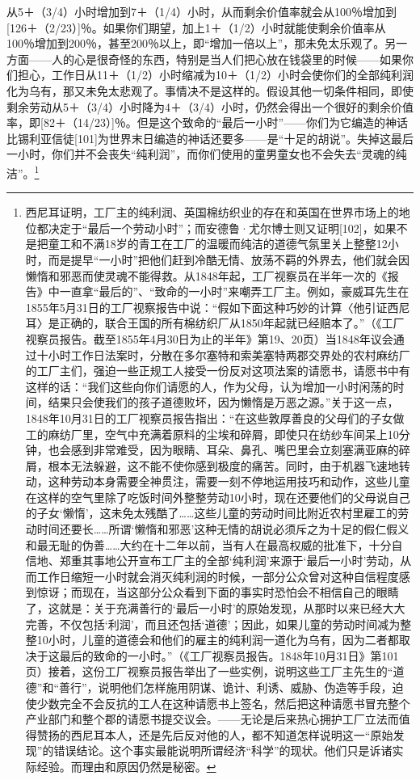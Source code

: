\documentclass{ctexbook}
\begin{document}
从5＋（3/4）小时增加到7＋（1/4）小时，从而剩余价值率就会从100％增加到[126＋（2/23）]％。如果你们期望，加上1＋（1/2）小时就能使剩余价值率从100％增加到200％，甚至200％以上，即“增加一倍以上”，那未免太乐观了。另一方面——人的心是很奇怪的东西，特别是当人们把心放在钱袋里的时候——如果你们担心，工作日从11＋（1/2）小时缩减为10＋（1/2）小时会使你们的全部纯利润化为乌有，那又未免太悲观了。事情决不是这样的。假设其他一切条件相同，即使剩余劳动从5＋（3/4）小时降为4＋（3/4）小时，仍然会得出一个很好的剩余价值率，即[82＋（14/23）]％。但是这个致命的“最后一小时”——你们为它编造的神话比锡利亚信徒[101]为世界末日编造的神话还要多——是“十足的胡说”。失掉这最后一小时，你们并不会丧失“纯利润”，而你们使用的童男童女也不会失去“灵魂的纯洁”。\footnote{西尼耳证明，工厂主的纯利润、英国棉纺织业的存在和英国在世界市场上的地位都决定于“最后一个劳动小时”；而安德鲁·尤尔博士则又证明[102]，如果不是把童工和不满18岁的青工在工厂的温暖而纯洁的道德气氛里关上整整12小时，而是提早“一小时”把他们赶到冷酷无情、放荡不羁的外界去，他们就会因懒惰和邪恶而使灵魂不能得救。从1848年起，工厂视察员在半年一次的《报告》中一直拿“最后的”、“致命的一小时”来嘲弄工厂主。例如，豪威耳先生在1855年5月31日的工厂视察报告中说：“假如下面这种巧妙的计算〈他引证西尼耳〉是正确的，联合王国的所有棉纺织厂从1850年起就已经赔本了。”（《工厂视察员报告。截至1855年4月30日为止的半年》第19、20页）当1848年议会通过十小时工作日法案时，分散在多尔塞特和索美塞特两郡交界处的农村麻纺厂的工厂主们，强迫一些正规工人接受一份反对这项法案的请愿书，请愿书中有这样的话：“我们这些向你们请愿的人，作为父母，认为增加一小时闲荡的时间，结果只会使我们的孩子道德败坏，因为懒惰是万恶之源。”关于这一点，1848年10月31日的工厂视察员报告指出：“在这些敦厚善良的父母们的子女做工的麻纺厂里，空气中充满着原料的尘埃和碎屑，即使只在纺纱车间呆上10分钟，也会感到非常难受，因为眼睛、耳朵、鼻孔、嘴巴里会立刻塞满亚麻的碎屑，根本无法躲避，这不能不使你感到极度的痛苦。同时，由于机器飞速地转动，这种劳动本身需要全神贯注，需要一刻不停地运用技巧和动作，这些儿童在这样的空气里除了吃饭时间外整整劳动10小时，现在还要他们的父母说自己的子女‘懒惰’，这未免太残酷了……这些儿童的劳动时间比附近农村里雇工的劳动时间还要长……所谓‘懒惰和邪恶’这种无情的胡说必须斥之为十足的假仁假义和最无耻的伪善……大约在十二年以前，当有人在最高权威的批准下，十分自信地、郑重其事地公开宣布工厂主的全部‘纯利润’来源于‘最后一小时’劳动，从而工作日缩短一小时就会消灭纯利润的时候，一部分公众曾对这种自信程度感到惊讶；而现在，当这部分公众看到下面的事实时恐怕会不相信自己的眼睛了，这就是：关于充满善行的‘最后一小时’的原始发现，从那时以来已经大大完善，不仅包括‘利润’，而且还包括‘道德’；因此，如果儿童的劳动时间减为整整10小时，儿童的道德会和他们的雇主的纯利润一道化为乌有，因为二者都取决于这最后的致命的一小时。”（《工厂视察员报告。1848年10月31日》第101页）接着，这份工厂视察员报告举出了一些实例，说明这些工厂主先生的“道德”和“善行”，说明他们怎样施用阴谋、诡计、利诱、威胁、伪造等手段，迫使少数完全不会反抗的工人在这种请愿书上签名，然后把这种请愿书冒充整个产业部门和整个郡的请愿书提交议会。——无论是后来热心拥护工厂立法而值得赞扬的西尼耳本人，还是先后反对他的人，都不知道怎样说明这一“原始发现”的错误结论。这个事实最能说明所谓经济“科学”的现状。他们只是诉诸实际经验。而理由和原因仍然是秘密。}
\end{document}
